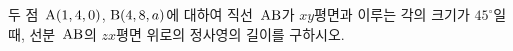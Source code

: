 두 점~$\mathrm{A}(1{,}\mkern3mu\mathopen{}4{,}\mkern3mu\mathopen{}0)$, $\mathrm{B}(4{,}\mkern3mu\mathopen{}8{,}\mkern3mu\mathopen{}a)$에 대하여 직선~$\mathrm{AB}$가 $xy$평면과 이루는 각의 크기가 $45^\circ$일 때, 선분~$\mathrm{AB}$의 $zx$평면 위로의 정사영의 길이를 구하시오. 
